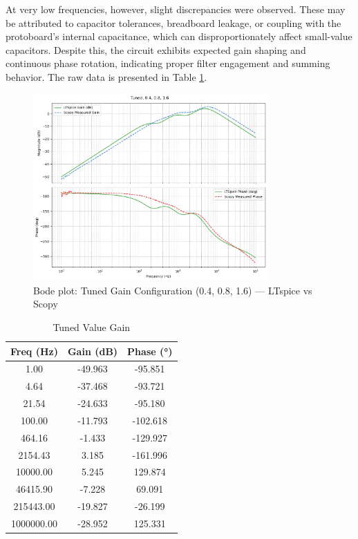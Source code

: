 \documentclass[12pt]{article}
\begin{document}
At very low frequencies, however, slight discrepancies were observed. These may be attributed to capacitor tolerances, breadboard leakage, or coupling with the protoboard’s internal capacitance, which can disproportionately affect small-value capacitors. Despite this, the circuit exhibits expected gain shaping and continuous phase rotation, indicating proper filter engagement and summing behavior. The raw data is presented in Table \ref{tab:tunedvalue}.
\begin{figure}[H]
	\centering
	\includegraphics[width=0.8\textwidth]{dp2tuned.png}
	\caption{Bode plot: Tuned Gain Configuration (0.4, 0.8, 1.6) — LTspice vs Scopy}
	\label{fig:tunedvalue}
\end{figure}
\begin{table}[H]
	\centering
	\begin{tabular}{|c|c|c|}
		\hline
		\textbf{Freq (Hz)} & \textbf{Gain (dB)} & \textbf{Phase (°)} \\
		\hline
		1.00               & -49.963            & -95.851            \\
		4.64               & -37.468            & -93.721            \\
		21.54              & -24.633            & -95.180            \\
		100.00             & -11.793            & -102.618           \\
		464.16             & -1.433             & -129.927           \\
		2154.43            & 3.185              & -161.996           \\
		10000.00           & 5.245              & 129.874            \\
		46415.90           & -7.228             & 69.091             \\
		215443.00          & -19.827            & -26.199            \\
		1000000.00         & -28.952            & 125.331            \\
		\hline
	\end{tabular}
	\caption{Tuned Value Gain}
	\label{tab:tunedvalue}
\end{table}
\end{document}
